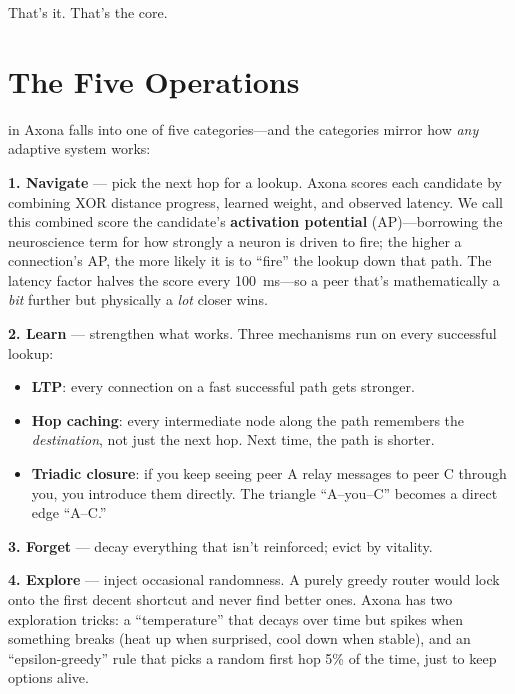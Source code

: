 \documentclass[nobib]{tufte-handout}
\begin{document}
That's it. That's the core.

\section{The Five Operations}

 in Axona falls into one of five categories---and the categories mirror how \emph{any} adaptive system works:

\textbf{1. Navigate} --- pick the next hop for a lookup. Axona scores each candidate by combining XOR distance progress, learned weight, and observed latency. We call this combined score the candidate's \textbf{activation potential} (AP)---borrowing the neuroscience term for how strongly a neuron is driven to fire; the higher a connection's AP, the more likely it is to ``fire'' the lookup down that path. The latency factor halves the score every 100~ms---so a peer that's mathematically a \emph{bit} further but physically a \emph{lot} closer wins.

\textbf{2. Learn} --- strengthen what works. Three mechanisms run on every successful lookup:

\begin{itemize}
  \item \textbf{LTP}: every connection on a fast successful path gets stronger.
  \item \textbf{Hop caching}: every intermediate node along the path remembers the \emph{destination}, not just the next hop. Next time, the path is shorter.
  \item \textbf{Triadic closure}: if you keep seeing peer A relay messages to peer C through you, you introduce them directly. The triangle ``A--you--C'' becomes a direct edge ``A--C.''
\end{itemize}

\textbf{3. Forget} --- decay everything that isn't reinforced; evict by vitality.

\textbf{4. Explore} --- inject occasional randomness. A purely greedy router would lock onto the first decent shortcut and never find better ones. Axona has two exploration tricks: a ``temperature'' that decays over time but spikes when something breaks (heat up when surprised, cool down when stable), and an ``epsilon-greedy'' rule that picks a random first hop 5\% of the time, just to keep options alive.
\end{document}
